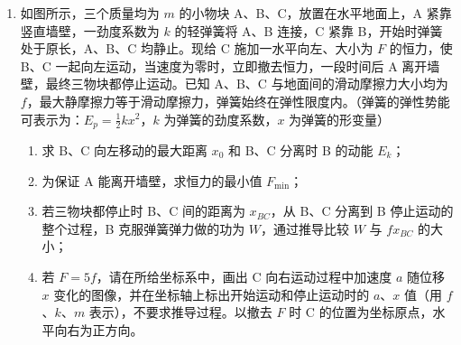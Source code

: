 \documentclass[\gkver]{gaokaozhenti}
\begin{document}
\begin{enumerate}
{$S = \frac{6(\sqrt{3} + 1)}{7\pi}L$

}

\item
如图所示，三个质量均为 $m$ 的小物块 A、B、C，放置在水平地面上，A 紧靠竖直墙壁，一劲度系数为 $k$ 的轻弹簧将 A、B 连接，C 紧靠 B，开始时弹簧处于原长，A、B、C 均静止。现给 C 施加一水平向左、大小为 $F$ 的恒力，使 B、C 一起向左运动，当速度为零时，立即撤去恒力，一段时间后 A 离开墙壁，最终三物块都停止运动。已知 A、B、C 与地面间的滑动摩擦力大小均为 $f$，最大静摩擦力等于滑动摩擦力，弹簧始终在弹性限度内。（弹簧的弹性势能可表示为：$E_{p} = \frac{1}{2}kx^{2}$，$k$ 为弹簧的劲度系数，$x$ 为弹簧的形变量）
\begin{enumerate}
	\item
	求 B、C 向左移动的最大距离 $x_{0}$ 和 B、C 分离时 B 的动能 $E_{k}$；
	\item
	为保证 A 能离开墙壁，求恒力的最小值 $F_{\min}$；
	\item
	若三物块都停止时 B、C 间的距离为 $x_{BC}$，从 B、C 分离到 B 停止运动的整个过程，B 克服弹簧弹力做的功为 $W$，通过推导比较 $W$ 与 $fx_{BC}$ 的大小；
	\item
	若 $F = 5f$，请在所给坐标系中，画出 C 向右运动过程中加速度 $a$ 随位移 $x$ 变化的图像，并在坐标轴上标出开始运动和停止运动时的 $a$、$x$ 值（用 $f$、$k$、$m$ 表示），不要求推导过程。以撤去 $F$ 时 C 的位置为坐标原点，水平向右为正方向。
\end{enumerate}


\end{enumerate}
\end{document}
